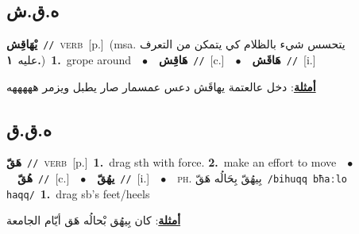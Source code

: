 \documentclass[10pt,a4paper,twoside]{article} %
\begin{document}
\begin{multicols}{2}
\vspace{-3mm}
\subsection*{\color{blue}\foreignlanguage{arabic}{ه.ق.ش}\color{blue}{}} 

{\setlength\topsep{0pt}\textbf{\foreignlanguage{arabic}{يْهَاقِش}}\ {\color{gray}\texttt{//}\color{black}}\ \textsc{verb}\ [p.]\ \color{gray}(msa. \foreignlanguage{arabic}{يتحسس شيء بالظلام كي يتمكن من التعرف عليه}~\foreignlanguage{arabic}{\textbf{١.}})\color{black}\ \textbf{1.}~grope around\ \ $\bullet$\ \ \setlength\topsep{0pt}\textbf{\foreignlanguage{arabic}{هَاقِش}}\ {\color{gray}\texttt{//}\color{black}}\ [c.]\ \ $\bullet$\ \ \setlength\topsep{0pt}\textbf{\foreignlanguage{arabic}{هَاقَش}}\ {\color{gray}\texttt{//}\color{black}}\ [i.]\  \begin{flushright}\color{gray}\foreignlanguage{arabic}{\textbf{\underline{\foreignlanguage{arabic}{أمثلة}}}: دخل عالعتمة يهاقَش دعس عمسمار صار يطبل ويزمر هههههه}\end{flushright}\color{black}} \vspace{2mm}

\vspace{-3mm}
\subsection*{\color{blue}\foreignlanguage{arabic}{ه.ق.ق}\color{blue}{}} 

{\setlength\topsep{0pt}\textbf{\foreignlanguage{arabic}{هَقّ}}\ {\color{gray}\texttt{//}\color{black}}\ \textsc{verb}\ [p.]\ \textbf{1.}~drag sth with force.  \textbf{2.}~make an effort to move\ \ $\bullet$\ \ \setlength\topsep{0pt}\textbf{\foreignlanguage{arabic}{هُقّ}}\ {\color{gray}\texttt{//}\color{black}}\ [c.]\ \ $\bullet$\ \ \setlength\topsep{0pt}\textbf{\foreignlanguage{arabic}{يهُقّ}}\ {\color{gray}\texttt{//}\color{black}}\ [i.]\ \ $\bullet$\ \ \textsc{ph.} \color{gray} \foreignlanguage{arabic}{بِيهُقّ بِحَالُه هَقّ}\color{black}\ {\color{gray}\texttt{/{\sffamily bihuqq bħaːlo haqq}/}\color{black}}\ \textbf{1.}~drag sb's feet/heels\  \begin{flushright}\color{gray}\foreignlanguage{arabic}{\textbf{\underline{\foreignlanguage{arabic}{أمثلة}}}: كان بِيهُق بْحالُه هَق أيّام الجامعة}\end{flushright}\color{black}} \vspace{2mm}


\end{multicols}
\end{document}
